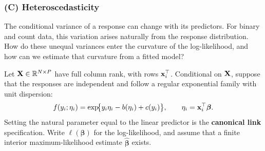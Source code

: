 \subsubsection*{(C) Heteroscedasticity}
{}
\label{ex:heteroscedasticity}

The conditional variance of a response can change with its predictors. For
binary and count data, this variation arises naturally from the response
distribution. How do these unequal variances enter the curvature of the
log-likelihood, and how can we estimate that curvature from a fitted model?

Let $\mathbf{X}\in\mathbb R^{N\times P}$ have full column rank, with rows
$\mathbf{x}_i^\top$. Conditional on $\mathbf{X}$, suppose that the responses are independent
and follow a regular exponential family with unit dispersion:
\[
    f(y_i;\eta_i)=\exp\!\bigl\{y_i\eta_i-b(\eta_i)+c(y_i)\bigr\},
    \qquad \eta_i=\mathbf{x}_i^\top\boldsymbol\beta.
\]
Setting the natural parameter equal to the linear predictor is the
\textbf{canonical link} specification. Write $\ell(\boldsymbol\beta)$ for the
log-likelihood, and assume that a finite interior maximum-likelihood estimate
$\hat{\boldsymbol\beta}$ exists.

